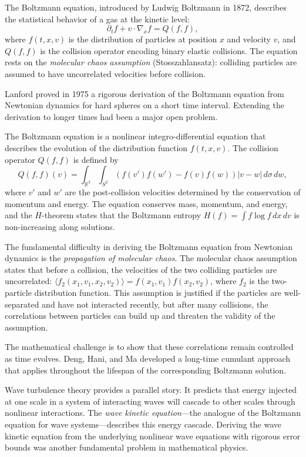The Boltzmann equation, introduced by Ludwig Boltzmann in 1872, describes the statistical behavior of a gas at the kinetic level:
\[
\partial_t f + v \cdot \nabla_x f = Q(f,f),
\]
where $f(t,x,v)$ is the distribution of particles at position $x$ and velocity $v$, and $Q(f,f)$ is the collision operator encoding binary elastic collisions. The equation rests on the \emph{molecular chaos assumption} (Stosszahlansatz): colliding particles are assumed to have uncorrelated velocities before collision.

Lanford proved in 1975 a rigorous derivation of the Boltzmann equation from Newtonian dynamics for hard spheres on a short time interval. Extending the derivation to longer times had been a major open problem.

The Boltzmann equation is a nonlinear integro-differential equation that describes the evolution of the distribution function $f(t,x,v)$. The collision operator $Q(f,f)$ is defined by
\[
Q(f,f)(v) = \int_{\mathbb{R}^3} \int_{S^2} (f(v') f(w') - f(v) f(w)) |v-w| \, d\sigma \, dw,
\]
where $v'$ and $w'$ are the post-collision velocities determined by the conservation of momentum and energy. The equation conserves mass, momentum, and energy, and the $H$-theorem states that the Boltzmann entropy $H(f) = \int f \log f \, dx \, dv$ is non-increasing along solutions.

The fundamental difficulty in deriving the Boltzmann equation from Newtonian dynamics is the \emph{propagation of molecular chaos}. The molecular chaos assumption states that before a collision, the velocities of the two colliding particles are uncorrelated: $\langle f_2(x_1, v_1, x_2, v_2) \rangle = f(x_1, v_1) f(x_2, v_2)$, where $f_2$ is the two-particle distribution function. This assumption is justified if the particles are well-separated and have not interacted recently, but after many collisions, the correlations between particles can build up and threaten the validity of the assumption.

The mathematical challenge is to show that these correlations remain controlled as time evolves. Deng, Hani, and Ma developed a long-time cumulant approach that applies throughout the lifespan of the corresponding Boltzmann solution.

Wave turbulence theory provides a parallel story. It predicts that energy injected at one scale in a system of interacting waves will cascade to other scales through nonlinear interactions. The \emph{wave kinetic equation}---the analogue of the Boltzmann equation for wave systems---describes this energy cascade. Deriving the wave kinetic equation from the underlying nonlinear wave equations with rigorous error bounds was another fundamental problem in mathematical physics.

